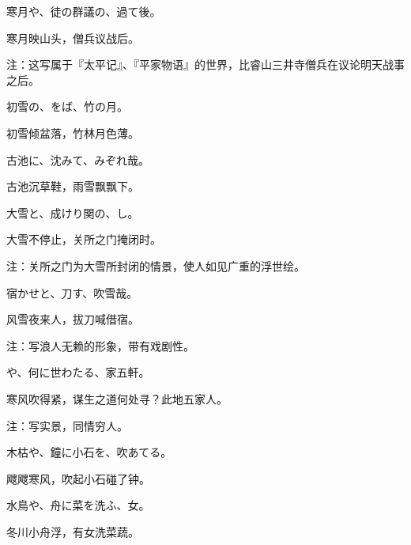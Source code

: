 \begin{haiku}
    {\FH 寒月や、徒の群議の、過て後。}

    {\FK 寒月映山头，僧兵议战后。}

    {\FT 注：这写属于『太平记』、『平家物语』的世界，比睿山三井寺僧兵在议论明天战事之后。}
\end{haiku}

\begin{haiku}
    {\FH 初雪の、をば、竹の月。}

    {\FK 初雪倾盆落，竹林月色薄。}
\end{haiku}

\begin{haiku}
    {\FH 古池に、沈みて、みぞれ哉。}

    {\FK 古池沉草鞋，雨雪飘飘下。}
\end{haiku}

\begin{haiku}
    {\FH 大雪と、成けり関の、し。}

    {\FK 大雪不停止，关所之门掩闭时。}

    {\FT 注：关所之门为大雪所封闭的情景，使人如见广重的浮世绘。}
\end{haiku}

\begin{haiku}
    {\FH 宿かせと、刀す、吹雪哉。}

    {\FK 风雪夜来人，拔刀喊借宿。}

    {\FT 注：写浪人无赖的形象，带有戏剧性。}
\end{haiku}

\begin{haiku}
    {\FH {}や、何に世わたる、家五軒。}

    {\FK 寒风吹得紧，谋生之道何处寻？此地五家人。}

    {\FT 注：写实景，同情穷人。}
\end{haiku}

\begin{haiku}
    {\FH 木枯や、鐘に小石を、吹あてる。}

    {\FK 飕飕寒风，吹起小石碰了钟。}
\end{haiku}

\begin{haiku}
    {\FH 水鳥や、舟に菜を洗ふ、女。}

    {\FK 冬川小舟浮，有女洗菜蔬。}
\end{haiku}

